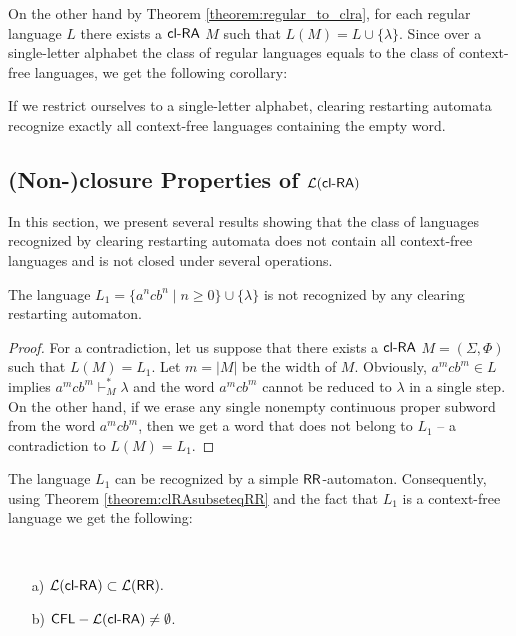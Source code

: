 On the other hand by Theorem \ref{theorem:regular_to_clra}, for each regular language $L$ there exists a $\mbox{\sf cl-RA\/}$ $M$ such that $L(M) = L \cup \{\lambda\}$. Since over a single-letter alphabet the class of regular languages equals to the class of context-free languages, we get the following corollary:

\begin{corollary}
If we restrict ourselves to a single-letter alphabet, clearing restarting automata recognize exactly all context-free languages containing the empty word.
\end{corollary}

\subsection{(Non-)closure Properties of ${\mathcal L}(\mbox{\sf cl-RA\/})$}
\label{se:nonClosureclRA}

In this section, we present several results showing that the class of languages recognized by clearing restarting automata does not contain all context-free languages and is not closed under several operations.

\begin{theorem}\label{theorem:L_1}
The language $L_1 = \{a^ncb^n \mid n \ge 0\} \cup \{\lambda\}$ is not recognized by any clearing restarting automaton.
\end{theorem}

\begin{proof}
For a contradiction, let us suppose that there exists a $\mbox{\sf cl-RA\/}$ $M = (\Sigma,\Phi)$ such that $L(M) = L_1$. Let $m = |M|$ be the width of $M$. Obviously, $a^m c b^m \in L$ implies $a^m c b^m \vdash_M^* \lambda$ and the word $a^m c b^m$ cannot be reduced to $\lambda$ in a single step. On the other hand, if we erase any single nonempty continuous proper subword from the word $a^m c b^m$, then  we get a word that does not belong to $L_1$ -- a contradiction to $L(M) = L_1$.
\end{proof}

The language $L_1$ can be recognized by a simple $\mbox{\sf RR}$-automaton. Consequently, using Theorem \ref{theorem:clRAsubseteqRR} and the fact that $L_1$ is a context-free language we get the following:

\begin{corollary}\label{corollary:clRasubsetRRWW}\hspace{1 cm} \
\begin{enumerate}
    \item[a)]
        ${\mathcal{L}}(\mbox{\sf cl-RA\/}) \subset {\mathcal{L}}(\mbox{\sf RR}).$
    \item[b)] \label{co:clRAnotallCFL}
        $\CFL - \calL{\clRA} \not= \emptyset$.
\end{enumerate}
\end{corollary}

